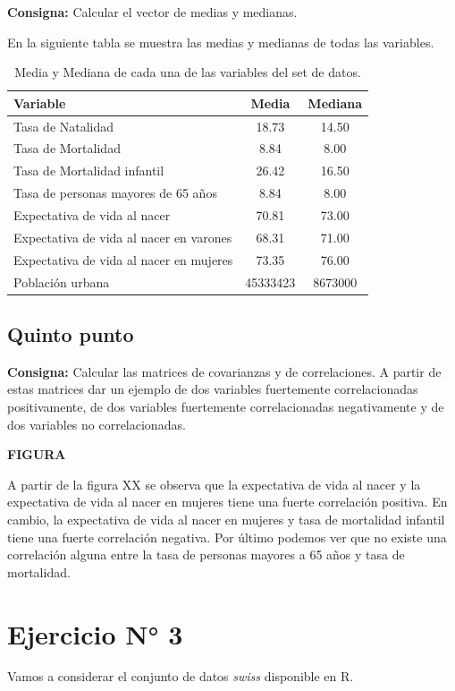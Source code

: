 \documentclass{article} %
\begin{document}
\textbf{Consigna:} Calcular el vector de medias y medianas.

En la siguiente tabla se muestra las medias y medianas de todas las variables.

\begin{table}[H]
	\centering
		\begin{tabular}{||l || c | c ||}
			\hline
			\hline
			Variable & Media & Mediana\\
			\hline			
			\hline
			Tasa de Natalidad & 18.73 & 14.50\\
			\hline
			Tasa de Mortalidad & 8.84 & 8.00\\
			\hline
			Tasa de Mortalidad infantil & 26.42 & 16.50\\
			\hline
			Tasa de personas mayores de 65 años & 8.84 & 8.00\\
			\hline
			Expectativa de vida al nacer & 70.81 & 73.00\\
			\hline
			Expectativa de vida al nacer en varones & 68.31 & 71.00\\
			\hline
			Expectativa de vida al nacer en mujeres & 73.35 & 76.00\\
			\hline
			Población urbana & 45333423 & 8673000\\
			\hline
			\hline
		\end{tabular}
		\caption{Media y Mediana de cada una de las variables del set de datos.}
	\label{tab:table-punto-2-4}
\end{table}

\subsection{Quinto punto}

\textbf{Consigna:} Calcular las matrices de covarianzas y de correlaciones. A partir de estas matrices dar un ejemplo de dos variables fuertemente correlacionadas positivamente, de dos variables fuertemente correlacionadas negativamente y de dos variables no correlacionadas.

\textbf{FIGURA}

A partir de la figura XX se observa que la expectativa de vida al nacer y la expectativa de vida al nacer en mujeres tiene una fuerte correlación positiva. En cambio, la expectativa de vida al nacer en mujeres y tasa de mortalidad infantil tiene una fuerte correlación negativa. Por último podemos ver que no existe una correlación alguna entre la tasa de personas mayores a 65 años y tasa de mortalidad.

\section{Ejercicio N° 3}
Vamos a considerar el conjunto de datos \textit{swiss} disponible en R.
\end{document}
